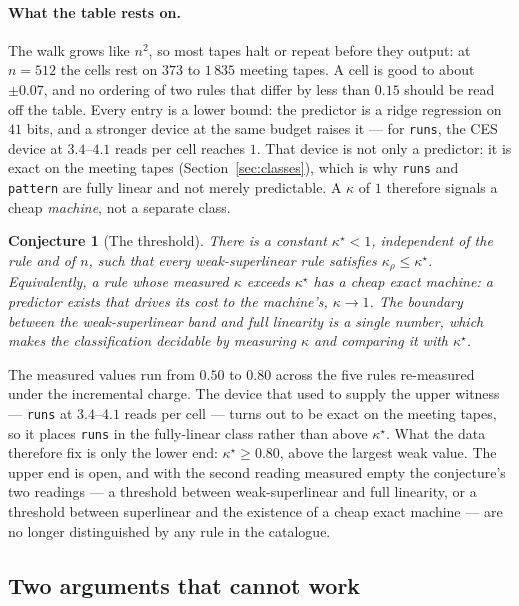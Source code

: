 \documentclass[11pt]{article}
\newtheorem{conjecture}{Conjecture}
\theoremstyle{remark}
\begin{document}
\paragraph{What the table rests on.} The walk grows like $n^{2}$, so most tapes halt or repeat before
they output: at $n=512$ the cells rest on $373$ to $1\,835$ meeting tapes. A cell is good to about
$\pm0.07$, and no ordering of two rules that differ by less than $0.15$ should be read off the table.
Every entry is a lower bound: the predictor is a ridge regression on $41$ bits, and a stronger device
at the same budget raises it --- for \texttt{runs}, the CES device at $3.4$--$4.1$ reads per cell reaches
$1$. That device is not only a predictor: it is exact on the meeting tapes (Section~\ref{sec:classes}),
which is why \texttt{runs} and \texttt{pattern} are fully linear and not merely predictable. A $\kappa$ of
$1$ therefore signals a cheap \emph{machine}, not a separate class.


\begin{conjecture}[The threshold]\label{conj:threshold}
There is a constant $\kappa^{\star}<1$, independent of the rule and of $n$, such that every
weak-superlinear rule satisfies $\kappa_{\rho}\le\kappa^{\star}$. Equivalently, a rule whose measured
$\kappa$ exceeds $\kappa^{\star}$ has a cheap exact machine: a predictor exists that drives its cost to
the machine's, $\kappa\to1$. The boundary between the weak-superlinear band and full linearity is a
single number, which makes the classification decidable by measuring $\kappa$ and comparing it with
$\kappa^{\star}$.
\end{conjecture}

The measured values run from $0.50$ to $0.80$ across the five rules re-measured under the incremental
charge. The device that used to supply the upper witness --- \texttt{runs} at $3.4$--$4.1$ reads per cell ---
turns out to be exact on the meeting tapes, so it places \texttt{runs} in the fully-linear class
rather than above $\kappa^{\star}$. What the data therefore fix is only the lower end:
$\kappa^{\star}\ge0.80$, above the largest weak value. The upper end is open, and with the
second reading measured empty the conjecture's two readings --- a threshold between
weak-superlinear and full linearity, or a threshold between superlinear and the existence of a cheap
exact machine --- are no longer distinguished by any rule in the catalogue.


\subsection{Two arguments that cannot work}\label{sec:ceiling}
\end{document}
